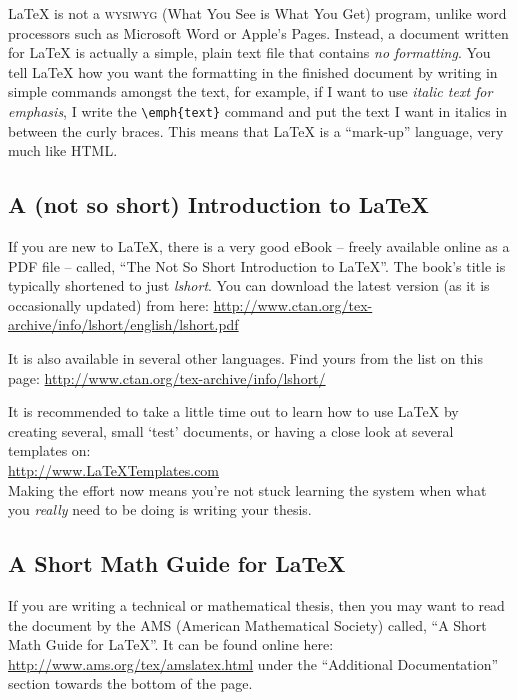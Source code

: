 \LaTeX{} is not a \textsc{wysiwyg} (What You See is What You Get) program, unlike word processors such as Microsoft Word or Apple's Pages.
Instead, a document written for \LaTeX{} is actually a simple, plain text file that contains \emph{no formatting}.
You tell \LaTeX{} how you want the formatting in the finished document by writing in simple commands amongst the text, for example, if I want to use \emph{italic text for emphasis}, I write the \verb|\emph{text}| command and put the text I want in italics in between the curly braces.
This means that \LaTeX{} is a \enquote{mark-up} language, very much like HTML.

\subsection{A (not so short) Introduction to \LaTeX{}}

If you are new to \LaTeX{}, there is a very good eBook -- freely available online as a PDF file -- called, \enquote{The Not So Short Introduction to \LaTeX{}}.
The book's title is typically shortened to just \emph{lshort}.
You can download the latest version (as it is occasionally updated) from here:
\url{http://www.ctan.org/tex-archive/info/lshort/english/lshort.pdf}

It is also available in several other languages. Find yours from the list on this page: \url{http://www.ctan.org/tex-archive/info/lshort/}

It is recommended to take a little time out to learn how to use \LaTeX{} by creating several, small `test' documents, or having a close look at several templates on:\\ 
\url{http://www.LaTeXTemplates.com}\\ 
Making the effort now means you're not stuck learning the system when what you \emph{really} need to be doing is writing your thesis.

\subsection{A Short Math Guide for \LaTeX{}}

If you are writing a technical or mathematical thesis, then you may want to read the document by the AMS (American Mathematical Society) called, \enquote{A Short Math Guide for \LaTeX{}}.
It can be found online here: \url{http://www.ams.org/tex/amslatex.html} under the \enquote{Additional Documentation} section towards the bottom of the page.

